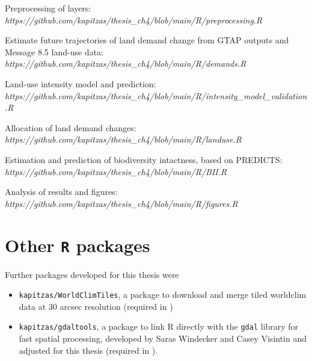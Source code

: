 \documentclass[titlesmallcaps,copyrightpage]{uomthesis}\usepackage[]{graphicx}\usepackage[]{color}
\begin{document}
\noindent Preprocessing of layers: \\
\textit{https://github.com/kapitzas/thesis\_ch4/blob/main/R/preprocessing.R}
\vspace{0.3cm}

\noindent Estimate future trajectories of land demand change from GTAP outputs and Message 8.5 land-use data: \\
\textit{https://github.com/kapitzas/thesis\_ch4/blob/main/R/demands.R}
\vspace{0.3cm}

\noindent Land-use intensity model and prediction: \\
\textit{https://github.com/kapitzas/thesis\_ch4/blob/main/R/intensity\_model\_validation.R}
\vspace{0.3cm}

\noindent Allocation of land demand changes: \\
\textit{https://github.com/kapitzas/thesis\_ch4/blob/main/R/landuse.R}
\vspace{0.3cm}

\noindent Estimation and prediction of biodiversity intactness, based on PREDICTS: \\
\textit{https://github.com/kapitzas/thesis\_ch4/blob/main/R/BII.R}
\vspace{0.3cm}


\noindent Analysis of results and figures: \\
\textit{https://github.com/kapitzas/thesis\_ch4/blob/main/R/figures.R}
\vspace{0.3cm}


\section{Other \texttt{R} packages}
\noindent Further packages developed for this thesis were 

\begin{itemize}

\item \texttt{kapitzas/WorldClimTiles}, a package to download and merge tiled worldclim data at 30 arcsec resolution (required in )
\item \texttt{kapitzas/gdaltools}, a package to link R directly with the \texttt{gdal} library for fast spatial processing, developed by Saras Windecker and Casey Visintin \citep{windecker_gdaltools_2021} and adjusted for this thesis (required in ).
\end{itemize}
\end{document}
